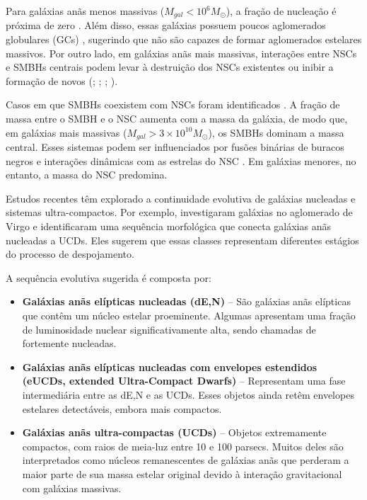 Para galáxias anãs menos massivas ($M_{gal} < 10^6 M_{\odot}$), a fração de nucleação é próxima de zero \citep{Ordenes_2018}. Além disso, essas galáxias possuem poucos aglomerados globulares (GCs) \citep{Forbes_2018}, sugerindo que não são capazes de formar aglomerados estelares massivos. Por outro lado, em galáxias anãs mais massivas, interações entre NSCs e SMBHs centrais podem levar à destruição dos NSCs existentes ou inibir a formação de novos (\citealp{Cote_2006}; \citealp{Neumayer_2012}; \citealp{Antonini_2015}; \citealp{Arca_2016}).

Casos em que SMBHs coexistem com NSCs foram identificados \citep{Graham_2009}. A fração de massa entre o SMBH e o NSC aumenta com a massa da galáxia, de modo que, em galáxias mais massivas ($M_{gal} > 3 \times 10^{10} M_{\odot}$), os SMBHs dominam a massa central. Esses sistemas podem ser influenciados por fusões binárias de buracos negros e interações dinâmicas com as estrelas do NSC \citep{Antonini_2015}. Em galáxias menores, no entanto, a massa do NSC predomina.

Estudos recentes têm explorado a continuidade evolutiva de galáxias nucleadas e sistemas ultra-compactos. Por exemplo, \cite{Wang_2023} investigaram galáxias no aglomerado de Virgo e identificaram uma sequência morfológica que conecta galáxias anãs nucleadas a UCDs. Eles sugerem que essas classes representam diferentes estágios do processo de despojamento.

\noindent A sequência evolutiva sugerida é composta por:

\begin{itemize}
    \item \textbf{Galáxias anãs elípticas nucleadas (dE,N)} – São galáxias anãs elípticas que contêm um núcleo estelar proeminente. Algumas apresentam uma fração de luminosidade nuclear significativamente alta, sendo chamadas de fortemente nucleadas.
    \item \textbf{Galáxias anãs elípticas nucleadas com envelopes estendidos (eUCDs, extended Ultra-Compact Dwarfs)} – Representam uma fase intermediária entre as dE,N e as UCDs. Esses objetos ainda retêm envelopes estelares detectáveis, embora mais compactos.
    \item \textbf{Galáxias anãs ultra-compactas (UCDs)} – Objetos extremamente compactos, com raios de meia-luz entre 10 e 100 parsecs. Muitos deles são interpretados como núcleos remanescentes de galáxias anãs que perderam a maior parte de sua massa estelar original devido à interação gravitacional com galáxias massivas.
\end{itemize}


